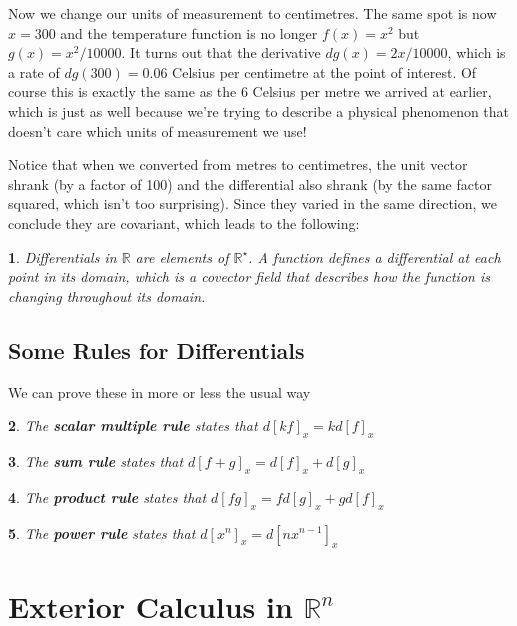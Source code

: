 \documentclass[oneside,english]{amsbook}
\numberwithin{section}{chapter}
\theoremstyle{plain}
\newtheorem{thm}{\protect\theoremname}
\theoremstyle{definition}
\providecommand{\theoremname}{Theorem}
\begin{document}
			Now we change our units of measurement to centimetres. The same spot is now $x = 300$ and the temperature function is no longer $f(x) = x^2$ but $g(x) = x^2/10000$. It turns out that the derivative $dg(x) = 2x/10000$, which is a rate of $dg(300) = 0.06$ Celsius per centimetre at the point of interest. Of course this is exactly the same as the 6 Celsius per metre we arrived at earlier, which is just as well because we're trying to describe a physical phenomenon that doesn't care which units of measurement we use!
			
			Notice that when we converted from metres to centimetres, the unit vector shrank (by a factor of 100) and the differential also shrank (by the same factor squared, which isn't too surprising). Since they varied in the same direction, we conclude they are covariant, which leads to the following:
			
			\begin{thm}
				Differentials in $\mathbb{R}$ are elements of $\mathbb{R}^\star$. A function defines a differential at each point in its domain, which is a covector field that describes how the function is changing throughout its domain.
			\end{thm}
						
		\section{Some Rules for Differentials}
			
			We can prove these in more or less the usual way
			
			\begin{thm}
				The \textbf{scalar multiple rule} states that $d[kf]_x = kd[f]_x$
			\end{thm}
			
			\begin{thm}
				The \textbf{sum rule} states that $d[f + g]_x = d[f]_x + d[g]_x$
			\end{thm}
			
			\begin{thm}
				The \textbf{product rule} states that $d[fg]_x = fd[g]_x + gd[f]_x$
			\end{thm}
			
			\begin{thm}
				The \textbf{power rule} states that $d[x^n]_x = d[nx^{n-1}]_x$
			\end{thm}

	\chapter{Exterior Calculus in $\mathbb{R}^n$}
	
\end{document}
